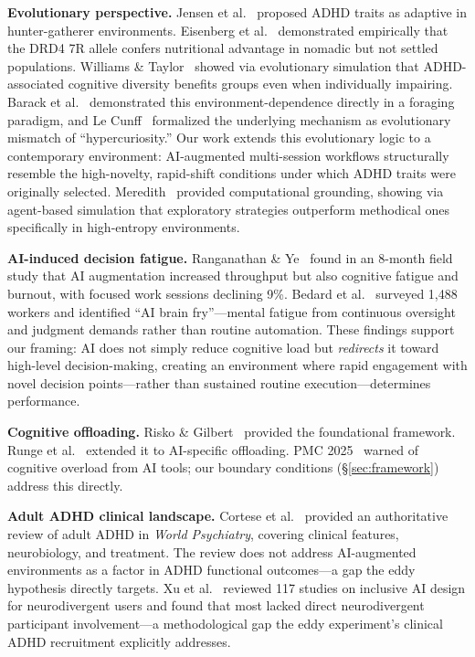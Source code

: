 \documentclass[sigconf,nonacm]{acmart}
\begin{document}
\textbf{Evolutionary perspective.} Jensen et al.~\cite{jensen1997} proposed ADHD traits as adaptive in hunter-gatherer environments. Eisenberg et al.~\cite{eisenberg2008} demonstrated empirically that the DRD4 7R allele confers nutritional advantage in nomadic but not settled populations. Williams \& Taylor~\cite{williams2006} showed via evolutionary simulation that ADHD-associated cognitive diversity benefits groups even when individually impairing. Barack et al.~\cite{barack2024} demonstrated this environment-dependence directly in a foraging paradigm, and Le Cunff~\cite{lecunff2024} formalized the underlying mechanism as evolutionary mismatch of ``hypercuriosity.'' Our work extends this evolutionary logic to a contemporary environment: AI-augmented multi-session workflows structurally resemble the high-novelty, rapid-shift conditions under which ADHD traits were originally selected. Meredith~\cite{meredith2025} provided computational grounding, showing via agent-based simulation that exploratory strategies outperform methodical ones specifically in high-entropy environments.

\textbf{AI-induced decision fatigue.} Ranganathan \& Ye~\cite{ranganathan2026} found in an 8-month field study that AI augmentation increased throughput but also cognitive fatigue and burnout, with focused work sessions declining 9\%. Bedard et al.~\cite{bedard2026} surveyed 1,488 workers and identified ``AI brain fry''---mental fatigue from continuous oversight and judgment demands rather than routine automation. These findings support our framing: AI does not simply reduce cognitive load but \emph{redirects} it toward high-level decision-making, creating an environment where rapid engagement with novel decision points---rather than sustained routine execution---determines performance.

\textbf{Cognitive offloading.} Risko \& Gilbert~\cite{risko2016} provided the foundational framework. Runge et al.~\cite{runge2023} extended it to AI-specific offloading. PMC 2025~\cite{pmc2025} warned of cognitive overload from AI tools; our boundary conditions (\S\ref{sec:framework}) address this directly.

\textbf{Adult ADHD clinical landscape.} Cortese et al.~\cite{cortese2025} provided an authoritative review of adult ADHD in \emph{World Psychiatry}, covering clinical features, neurobiology, and treatment. The review does not address AI-augmented environments as a factor in ADHD functional outcomes---a gap the eddy hypothesis directly targets. Xu et al.~\cite{xu2025} reviewed 117 studies on inclusive AI design for neurodivergent users and found that most lacked direct neurodivergent participant involvement---a methodological gap the eddy experiment's clinical ADHD recruitment explicitly addresses.
\end{document}
